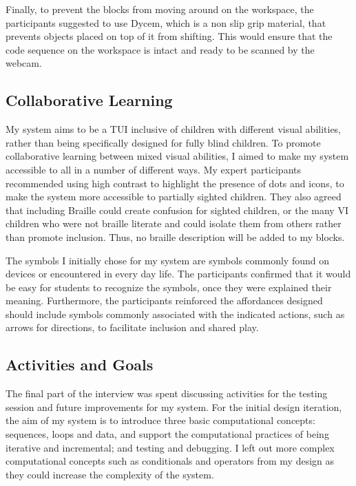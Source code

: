 \documentclass[oneside,%
                    author={Malak Hajji},
                    degree={BSc},
                    title={Designing An Accessible Ozobot Programming Platform for Students},
                  subtitle={With Mixed Visual Abilities}]{dissertation}
\begin{document}
Finally, to prevent the blocks from moving around on the workspace, the participants suggested to use Dycem, which is a non slip grip material, that prevents objects placed on top of it from shifting. This would ensure that the code sequence on the workspace is intact and ready to be scanned by the webcam.

\subsection{Collaborative Learning}
My system aims to be a TUI inclusive of children with different visual abilities, rather than being specifically designed for fully blind children. To promote collaborative learning between mixed visual abilities, I aimed to make my system accessible to all in a number of different ways. My expert participants recommended using high contrast to highlight the presence of dots and icons, to make the system more accessible to partially sighted children. They also agreed that including Braille could create confusion for sighted children, or the many VI children who were not braille literate and could isolate them from others rather than promote inclusion. Thus, no braille description will be added to my blocks.

The symbols I initially chose for my system are symbols commonly found on devices or encountered in every day life. The participants confirmed that it would be easy for students to recognize the symbols, once they were explained their meaning. Furthermore, the participants reinforced the affordances designed should include symbols commonly associated with the indicated actions, such as arrows for directions, to facilitate inclusion and shared play.

\subsection{Activities and Goals}
The final part of the interview was spent discussing activities for the testing session and future improvements for my system. For the initial design iteration, the aim of my system is to introduce three basic computational concepts: sequences, loops and data, and support the computational practices of being iterative and incremental; and testing and debugging. I left out more complex computational concepts such as conditionals and operators from my design as they could increase the complexity of the system. 
\end{document}
